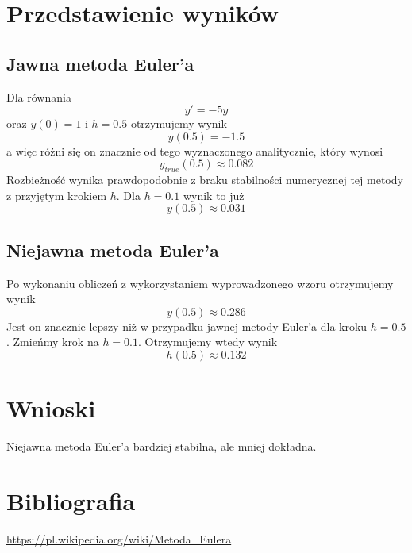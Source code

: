\documentclass[11pt, leqno]{scrartcl}
\begin{document}
    \section{Przedstawienie wyników}
    \subsection{Jawna metoda Euler'a}
    Dla równania
    \[
        y'=-5y
    \]
    oraz $y(0)=1$ i $h=0.5$ otrzymujemy wynik
    \[
        y(0.5)=-1.5
    \]
    a więc różni się on znacznie od tego wyznaczonego
    analitycznie, który wynosi
    \[
        y_{true}(0.5) \approx 0.082
    \]
    Rozbieżność wynika prawdopodobnie z braku stabilności
    numerycznej tej metody z przyjętym krokiem $h$. Dla
    $h=0.1$ wynik to już
    \[
        y(0.5) \approx 0.031
    \]

    \subsection{Niejawna metoda Euler'a}
    Po wykonaniu obliczeń z wykorzystaniem wyprowadzonego
    wzoru otrzymujemy wynik
    \[
        y(0.5) \approx 0.286
    \]
    Jest on znacznie lepszy niż w przypadku jawnej
    metody Euler'a dla kroku $h=0.5$. Zmieńmy krok
    na $h=0.1$. Otrzymujemy wtedy wynik
    \[
        h(0.5) \approx 0.132
    \]

    \section{Wnioski}
    Niejawna metoda Euler'a bardziej stabilna, ale mniej
    dokładna.

    \section{Bibliografia}
    \url{https://pl.wikipedia.org/wiki/Metoda_Eulera}
    
\end{document}
